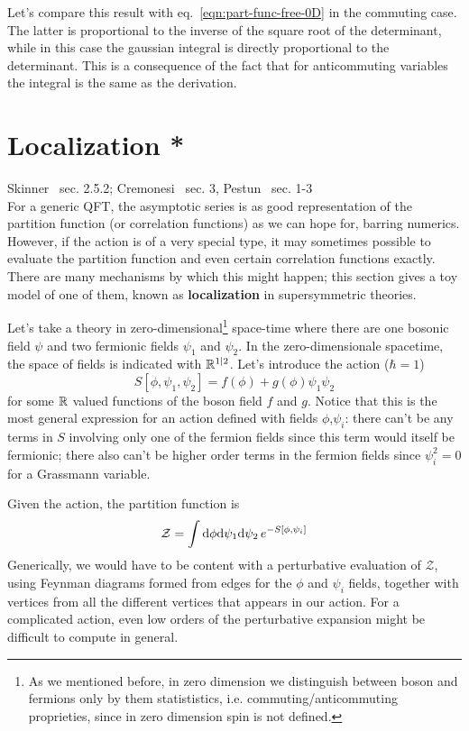 \documentclass[../main/main.tex]{subfiles}
\begin{document}
Let's compare this result with eq.~\eqref{eqn:part-func-free-0D} in the commuting case. The latter is proportional to the inverse of the square root of the determinant, while in this case the gaussian integral is directly proportional to the determinant. This is a consequence of the fact that for anticommuting variables the integral is the same as the derivation.

\section{Localization *}

\textsf{Skinner~\cite{Skinner:2018aa} sec. 2.5.2; Cremonesi~\cite{Cremonesi:2013aa} sec. 3, Pestun~\cite{Pestun_2012} sec. 1-3}\\

For a generic QFT, the asymptotic series is as good representation of the partition function (or correlation functions) as we can hope for, barring numerics. However, if the action is of a very special type, it may sometimes possible to evaluate the partition function and even certain correlation functions exactly. There are many mechanisms by which this might happen; this section gives a toy model of one of them, known as \textbf{localization} in supersymmetric theories. 

Let's take a theory in zero-dimensional\footnote{As we mentioned before, in zero dimension we distinguish between boson and fermions only by them statististics, i.e. commuting/anticommuting proprieties, since in zero dimension spin is not defined.} space-time where there are one bosonic field $\psi$ and two fermionic fields $\psi_1$ and $\psi_2$. In the zero-dimensionale spacetime, the space of fields is indicated with $\mathbb{R}^{1|2}$. Let's introduce the action ($\hbar=1$)
\[S[\phi,\psi_1,\psi_2]=f(\phi)+g(\phi)\psi_1\psi_2\]
for some $\mathbb{R}$ valued functions of the boson field $f$ and $g$. Notice that this is the most general expression for an action defined with fields $\phi$,$\psi_i$: there can't be any terms in $S$ involving only one of the fermion fields since this term would itself be fermionic; there also can't be higher order terms in the fermion fields since $\psi^2_i=0$ for a Grassmann variable. 

Given the action, the partition function is
\begin{equation}\label{eqn:-part-func-localization}
\mathcal Z=\int\textup{d}\phi\textup{d}\psi_1\textup{d}\psi_2\,e^{-S[\phi,\psi_i]}
\end{equation}
Generically, we would have to be content with a perturbative evaluation of $\mathcal Z$, using Feynman diagrams formed from edges for the $\phi$ and  $\psi_i$ fields, together with vertices from all the different vertices that appears in our action. For a complicated action, even low orders of the perturbative expansion might be difficult to compute in general. 
\end{document}
